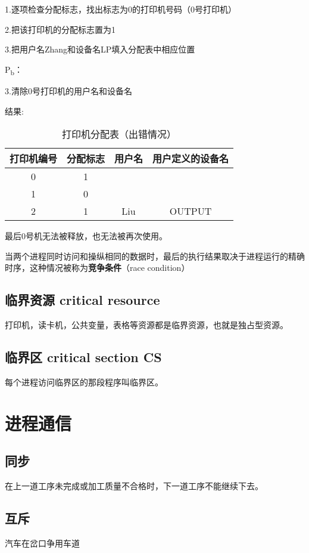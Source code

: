\documentclass{ctexart}
\begin{document}
1.逐项检查分配标志，找出标志为0的打印机号码（0号打印机）

2.把该打印机的分配标志置为1

3.把用户名Zhang和设备名LP填入分配表中相应位置

P\textsubscript{b}：

3.清除0号打印机的用户名和设备名

结果:
\begin{table}[h]  %
    \centering     %
    \caption{打印机分配表（出错情况）}  %
    \begin{tabular}{|c|c|c|c|}  %
        \hline
        \textbf{打印机编号} & \textbf{分配标志} & \textbf{用户名} & \textbf{用户定义的设备名} \\  %
        \hline
        0 & 1 &  &  \\  %
        \hline
        1 & 0 &  &\\
        \hline
        2 & 1 & Liu & OUTPUT \\
        \hline
    \end{tabular}
\end{table}
最后0号机无法被释放，也无法被再次使用。

当两个进程同时访问和操纵相同的数据时，最后的执行结果取决于进程运行的精确时序，这种情况被称为\textbf{竞争条件}（race condition）

\subsection{临界资源 critical resource}
打印机，读卡机，公共变量，表格等资源都是临界资源，也就是独占型资源。
\subsection{临界区 critical section CS}
每个进程访问临界区的那段程序叫临界区。
\section{进程通信}
\subsection{同步}
在上一道工序未完成或加工质量不合格时，下一道工序不能继续下去。
\subsection{互斥}
汽车在岔口争用车道
\end{document}
